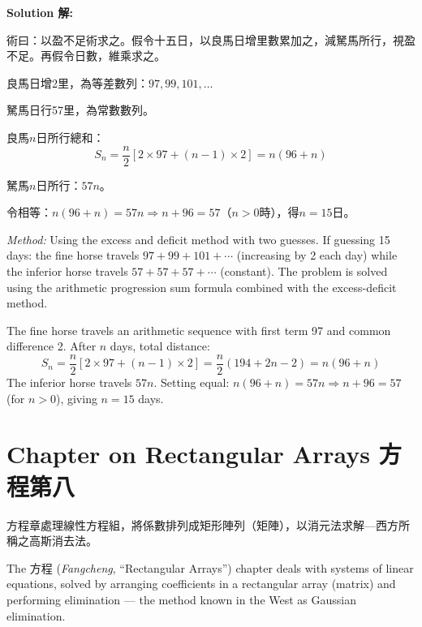 \documentclass[11pt,a4paper]{article}
\newcommand{\zh}[1]{{\CJKfamily{\CJKrmdefault} #1}}
\newenvironment{chside}{%
  \begin{minipage}[t]{0.48\textwidth}%
  \setlength{\parindent}{1.5em}%
  \linespread{1.25}\selectfont%
  \small%
}{%
  \end{minipage}%
}
\newenvironment{enside}{%
  \hfill\begin{minipage}[t]{0.48\textwidth}%
  \setlength{\parindent}{1em}%
  \linespread{1.15}\selectfont%
  \small%
}{%
  \end{minipage}%
}
\newenvironment{solution}{%
  \par\medskip\noindent\textbf{\textcolor{notecolor}{Solution \zh{解}:}}\par\nopagebreak
  \small\setlength{\parindent}{1em}%
}{%
  \par\medskip%
}
\begin{document}
\begin{solution}
\noindent\begin{chside}
\zh{術曰：以盈不足術求之。假令十五日，以良馬日增里數累加之，減駑馬所行，視盈不足。再假令日數，維乘求之。}

良馬日增2里，為等差數列：$97, 99, 101, \ldots$

駑馬日行57里，為常數數列。

良馬$n$日所行總和：
\[
S_n = \frac{n}{2}[2 \times 97 + (n-1) \times 2] = n(96 + n)
\]

駑馬$n$日所行：$57n$。

令相等：$n(96 + n) = 57n \Rightarrow n + 96 = 57$（$n > 0$時），得$n = 15$日。
\end{chside}%
\begin{enside}
\textit{Method:} Using the excess and deficit method with two guesses. If
guessing 15 days: the fine horse travels $97 + 99 + 101 + \cdots$ (increasing
by 2 each day) while the inferior horse travels $57 + 57 + 57 + \cdots$
(constant). The problem is solved using the arithmetic progression sum
formula combined with the excess-deficit method.

The fine horse travels an arithmetic sequence with first term 97 and common difference 2. After $n$ days, total distance:
\[
S_n = \frac{n}{2}[2 \times 97 + (n-1) \times 2] = \frac{n}{2}(194 + 2n - 2) = n(96 + n)
\]
The inferior horse travels $57n$. Setting equal: $n(96 + n) = 57n \Rightarrow n + 96 = 57$ (for $n > 0$), giving $n = 15$ days.
\end{enside}
\end{solution}

\newpage

\section{Chapter on Rectangular Arrays \zh{方程第八}}
\label{sec:fangcheng}

\noindent\begin{chside}
\zh{方程}章處理線性方程組，將係數排列成矩形陣列（矩陣），以消元法求解---西方所稱之高斯消去法。
\end{chside}%
\begin{enside}
The \zh{方程} (\textit{Fangcheng}, ``Rectangular Arrays'') chapter deals
with systems of linear equations, solved by arranging coefficients in a
rectangular array (matrix) and performing elimination --- the method known in
the West as Gaussian elimination.
\end{enside}
\end{document}

